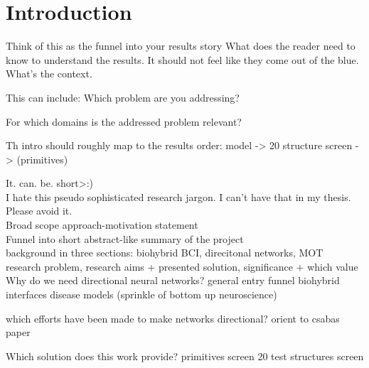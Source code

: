 \section{Introduction}


Think of this as the funnel into your results story 
What does the reader need to know to understand the results. It should not feel 
like they come out of the blue. What's the context.

This can include: Which problem are you addressing? 

For which domains is the addressed problem relevant? 

Th intro should roughly map to the results order:
    model -> 20 structure screen -> (primitives)

It. can. be. short>:) \\

I hate this pseudo sophisticated research  jargon. I can't have that in my thesis. Please avoid it. \\


Broad scope approach-motivation statement \\
Funnel into short abstract-like summary of the project \\
background in three sections: biohybrid BCI, direcitonal networks, MOT \\
research problem, research aims + presented solution,  significance + which value \\


Why do we need directional neural networks?
    general entry funnel
    biohybrid interfaces
    disease models (sprinkle of bottom up neuroscience)

which efforts have been made to make networks directional?
    orient to csabas paper

Which solution does this work provide?
    primitives screen
    20 test structures screen






\newpage
